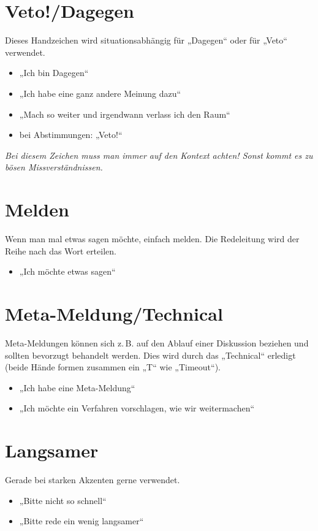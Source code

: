 \documentclass{neulingsheft}
\begin{document}
{\section{Veto!/Dagegen}
Dieses Handzeichen wird situationsabhängig für „Dagegen“ oder für „Veto“
verwendet.
\begin{itemize}
	\item „Ich bin Dagegen“
	\item „Ich habe eine ganz andere Meinung dazu“
	\item „Mach so weiter und irgendwann verlass ich den Raum“
	\item bei Abstimmungen: „Veto!“
\end{itemize}
\emph{Bei diesem Zeichen muss man immer auf den Kontext achten! Sonst kommt es
zu bösen Missverständnissen.}

\section{Melden}
Wenn man mal etwas sagen möchte, einfach melden. Die Redeleitung wird der Reihe
nach das Wort erteilen.
\begin{itemize}
	\item „Ich möchte etwas sagen“
\end{itemize}

\section{Meta-Meldung/Technical}
Meta-Meldungen können sich z.\,B. auf den Ablauf einer Diskussion beziehen und
sollten bevorzugt behandelt werden. Dies wird durch das „Technical“ erledigt
(beide Hände formen zusammen ein „T“ wie „Timeout“).
\begin{itemize}
	\item „Ich habe eine Meta-Meldung“
	\item „Ich möchte ein Verfahren vorschlagen, wie wir weitermachen“
\end{itemize}

\section{Langsamer}
Gerade bei starken Akzenten gerne verwendet.
\begin{itemize}
	\item „Bitte nicht so schnell“
	\item „Bitte rede ein wenig langsamer“
\end{itemize}

}
\end{document}

